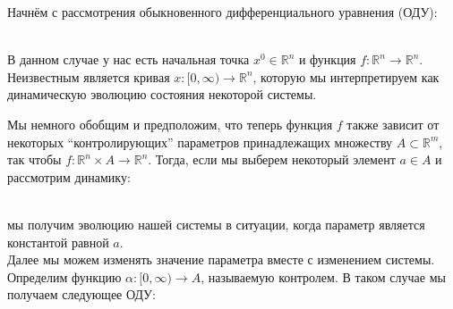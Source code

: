 






Начнём с рассмотрения обыкновенного дифференциального уравнения (ОДУ): \\

\

В данном случае у нас есть начальная точка $x^0 \in \mathbb{R}^n$ и функция $f: \mathbb{R}^n  \rightarrow \mathbb{R}^n$. Неизвестным является кривая $x: [0, \infty) \rightarrow \mathbb{R}^n$, которую мы интерпретируем как динамическую эволюцию состояния некоторой системы. \\


Мы немного обобщим и предположим, что теперь функция $f$ также зависит от некоторых ``контролирующих'' параметров принадлежащих множеству $A \subset \mathbb{R}^m$, так чтобы $f: \mathbb{R}^n \times A \rightarrow \mathbb{R}^n$. Тогда, если мы выберем некоторый элемент $a \in A$ и рассмотрим динамику: \\

\

мы получим эволюцию нашей системы в ситуации, когда параметр является константой равной $a$. \\

Далее мы можем изменять значение параметра вместе с изменением системы. Определим функцию $\alpha: [0, \infty) \rightarrow A$, называемую контролем. В таком случае мы получаем следующее ОДУ: \\

\

